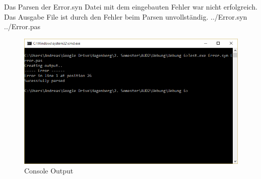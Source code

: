 \documentclass[a4papr,12pt]{article}
\begin{document}
\newpage
\raggedright
Das Parsen der Error.syn Datei mit dem eingebauten Fehler war nicht erfolgreich. Das Ausgabe File ist durch den Fehler beim Parsen unvollständig.
\newline
 {../Error.syn}
 {../Error.pas}
\begin{figure}[H]
	\centering
	\includegraphics[scale=0.7]{./pictures/2.png}
	\caption{Console Output}
	\label{fig: ParserTest}
\end{figure}
\raggedright
\end{document}
